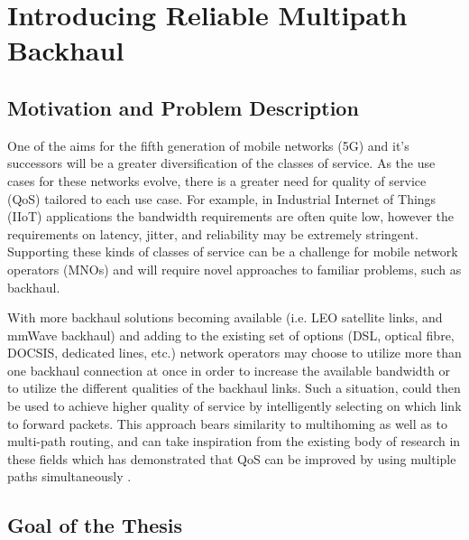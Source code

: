 
\cleardoublepage
\chapter{Introducing Reliable Multipath Backhaul}

\label{cha:introduction}

\section{Motivation and Problem Description}
\label{sec:motivation}

One of the aims for the fifth generation of mobile networks (5G) and it's successors will be a greater diversification of the classes of service. As the use cases for these networks evolve, there is a greater need for quality of service (QoS) tailored to each use case. For example, in Industrial Internet of Things (IIoT) applications the bandwidth requirements are often quite low, however the requirements on latency, jitter, and reliability may be extremely stringent. Supporting these kinds of classes of service can be a challenge for mobile network operators (MNOs) and will require novel approaches to familiar problems, such as backhaul.

With more backhaul solutions becoming available (i.e. LEO satellite links, and mmWave backhaul) and adding to the existing set of options (DSL, optical fibre, DOCSIS, dedicated lines, etc.) network operators may choose to utilize more than one backhaul connection at once in order to increase the available bandwidth or to utilize the different qualities of the backhaul links. Such a situation, could then be used to achieve higher quality of service by intelligently selecting on which link to forward packets. This approach bears similarity to multihoming as well as to multi-path routing, and can take inspiration from the existing body of research in these fields which has demonstrated that QoS can be improved by using multiple paths simultaneously \cite{akella2003measurement, tao2005improving, habib2007improving, goldenberg2004optimizing, huang2008multiconstrained, akella2008performance}.



\section{Goal of the Thesis}
\label{sec:goal}

